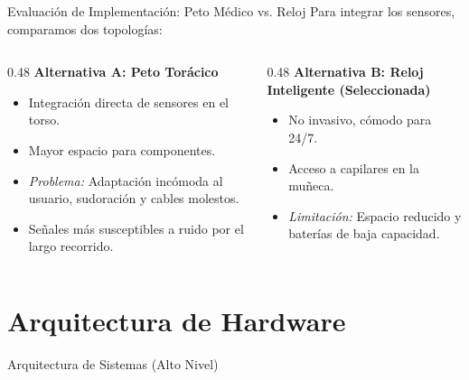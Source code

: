 \documentclass[aspectratio=169, 10pt]{beamer}
\begin{document}
\begin{frame}{Evaluación de Implementación: Peto Médico vs. Reloj}
    Para integrar los sensores, comparamos dos topologías:
    \vspace{0.3cm}
    
    \begin{columns}[T]
        \begin{column}{0.48\textwidth}
            \textbf{Alternativa A: Peto Torácico}
            \begin{itemize}
                \item[+] Integración directa de sensores en el torso.
                \item[+] Mayor espacio para componentes.
                \item[-] \textit{Problema:} Adaptación incómoda al usuario, sudoración y cables molestos.
                \item[-] Señales más susceptibles a ruido por el largo recorrido.
            \end{itemize}
        \end{column}
        
        \begin{column}{0.48\textwidth}
            \textbf{Alternativa B: Reloj Inteligente (Seleccionada)}
            \begin{itemize}
                \item[+] No invasivo, cómodo para 24/7.
                \item[+] Acceso a capilares en la muñeca.
                \item[-] \textit{Limitación:} Espacio reducido y baterías de baja capacidad.
            \end{itemize}
        \end{column}
    \end{columns}
\end{frame}

\section{Arquitectura de Hardware}

\begin{frame}{Arquitectura de Sistemas (Alto Nivel)}
    \begin{center}
        \resizebox{\linewidth}{!}{}
    \end{center}
\end{frame}
\end{document}
